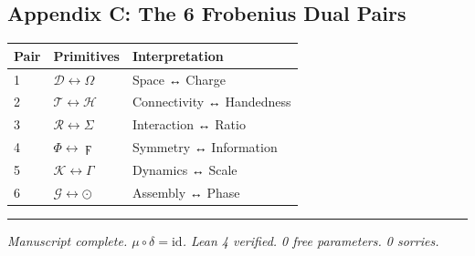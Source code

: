 \hypertarget{appendix-c-the-6-frobenius-dual-pairs}{%
\subsection{Appendix C: The 6 Frobenius Dual
Pairs}\label{appendix-c-the-6-frobenius-dual-pairs}}

\begin{longtable}[]{@{}lll@{}}
\toprule
Pair & Primitives & Interpretation\tabularnewline
\midrule
\endhead
1 & \(\mathcal{D} \leftrightarrow \Omega\) & Space ↔
Charge\tabularnewline
2 & \(\mathcal{T} \leftrightarrow \mathcal{H}\) & Connectivity ↔
Handedness\tabularnewline
3 & \(\mathcal{R} \leftrightarrow \Sigma\) & Interaction ↔
Ratio\tabularnewline
4 & \(\Phi \leftrightarrow \digamma\) & Symmetry ↔
Information\tabularnewline
5 & \(\mathcal{K} \leftrightarrow \Gamma\) & Dynamics ↔
Scale\tabularnewline
6 & \(\mathcal{G} \leftrightarrow \odot\) & Assembly ↔
Phase\tabularnewline
\bottomrule
\end{longtable}

\begin{center}\rule{0.5\linewidth}{0.5pt}\end{center}

\emph{Manuscript complete. \(\mu \circ \delta = \text{id}\). Lean 4
verified. 0 free parameters. 0 sorries.}
